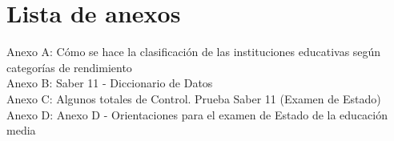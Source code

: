 \chapter*{Lista de anexos}
\normalsize

\noindent Anexo A: Cómo se hace la clasificación de las instituciones educativas según categorías de rendimiento \\
Anexo B: Saber 11 - Diccionario de Datos\\
Anexo C: Algunos totales de Control. Prueba Saber 11 (Examen de Estado)\\
Anexo D: Anexo D - Orientaciones para el examen de Estado de la educación media\\
